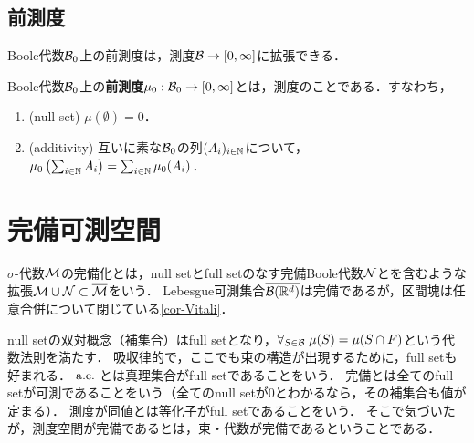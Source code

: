 \documentclass[uplatex, dvipdfmx]{jsreport}
\begin{document}
\subsection{前測度}

\begin{tcolorbox}[colframe=ForestGreen, colback=ForestGreen!10!white,breakable,colbacktitle=ForestGreen!40!white,coltitle=black,fonttitle=\bfseries\sffamily,
title=]
    Boole代数$\mathcal{B}_0$上の前測度は，測度$\mathcal{B}\to[0,\infty]$に拡張できる．
\end{tcolorbox}

\begin{definition}
    Boole代数$\mathcal{B}_0$上の\textbf{前測度}$\mu_0:\mathcal{B}_0\to[0,\infty]$とは，測度のことである．すなわち，
    \begin{enumerate}
        \item (null set) $\mu(\emptyset)=0$．
        \item (additivity) 互いに素な$\mathcal{B}_0$の列$(A_i)_{i\in\mathbb{N}}$について，$\mu_0\left(\sum_{i\in\mathbb{N}}A_i\right)=\sum_{i\in\mathbb{N}}\mu_0(A_i)$．
    \end{enumerate}
\end{definition}

\section{完備可測空間}

\begin{tcolorbox}[colframe=ForestGreen, colback=ForestGreen!10!white,breakable,colbacktitle=ForestGreen!40!white,coltitle=black,fonttitle=\bfseries\sffamily,
title=]
    $\sigma$-代数$\mathcal{M}$の完備化とは，null setとfull setのなす完備Boole代数$\mathcal{N}$とを含むような拡張$\mathcal{M}\cup\mathcal{N}\subset\overline{\mathcal{M}}$をいう．
    Lebesgue可測集合$\overline{\mathcal{B}(\mathbb{R}^d)}$は完備であるが，区間塊は任意合併について閉じている\ref{cor-Vitali}．
\end{tcolorbox}

\begin{tcolorbox}[colframe=ForestGreen, colback=ForestGreen!10!white,breakable,colbacktitle=ForestGreen!40!white,coltitle=black,fonttitle=\bfseries\sffamily,
title=距離空間には完備化があるべき，測度空間にも完備化が標準的に取れるべき．これをあくまでも代数構造から抽出する．]
    null setの双対概念（補集合）はfull setとなり，$\forall_{S\in\mathcal{B}}\;\mu(S)=\mu(S\cap F)$という代数法則を満たす．
    吸収律的で，ここでも束の構造が出現するために，full setも好まれる．
    $\mathrm{a.e.}\;$とは真理集合がfull setであることをいう．
    完備とは全てのfull setが可測であることをいう（全てのnull setが$0$とわかるなら，その補集合も値が定まる）．
    測度が同値とは等化子がfull setであることをいう．
    そこで気づいたが，測度空間が完備であるとは，束・代数が完備であるということである．
\end{tcolorbox}
\end{document}
